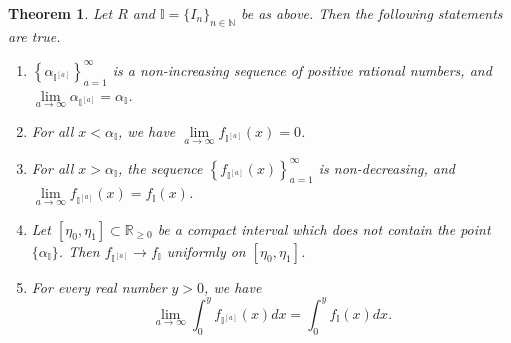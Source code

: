 \documentclass[12pt,a4paper]{amsart}
\theoremstyle{plain}
\newtheorem{theorem}{Theorem}[section]
\theoremstyle{definition}
\numberwithin{equation}{theorem}
\begin{document}
\begin{theorem}\label{approx_noeth_filt}
Let $R$ and $\mathbb{I}=\{I_n\}_{n\in\mathbb{N}}$ be as above. Then the following statements are true.
\begin{enumerate}[$(i)$]
 \item $\left\{\alpha_{\mathbb{I}^{[a]}}\right\}_{a=1}^{\infty}$ is a non-increasing sequence of positive rational numbers, and $\lim\limits_{a\to\infty} \alpha_{\mathbb{I}^{[a]}} = \alpha_{\mathbb{I}}$.
 \item For all $x<\alpha_{\mathbb{I}}$, we have $\lim\limits_{a\to\infty} f_{\mathbb{I}^{[a]}}(x)=0$.
 \item For all $x>\alpha_{\mathbb{I}}$, the sequence $\left\{f_{\mathbb{I}^{[a]}}(x)\right\}_{a=1}^{\infty}$ is non-decreasing, and $\lim\limits_{a\to\infty} f_{\mathbb{I}^{[a]}}(x)=f_{\mathbb{I}}(x)$.
 \item Let $[\eta_0,\eta_1]\subset \mathbb{R}_{\geq 0}$ be a compact interval which does not contain the point $\{\alpha_{\mathbb{I}}\}$. Then $f_{\mathbb{I}^{[a]}} \to f_{\mathbb{I}}$ uniformly on $[\eta_0,\eta_1]$.
 \item For every real number $y>0$, we have $$\lim_{a\to\infty}\int_0^{y}f_{\mathbb{I}^{[a]}}(x)dx = \int_0^{y}f_{\mathbb{I}}(x)dx.$$
\end{enumerate}
\end{theorem}
\end{document}
